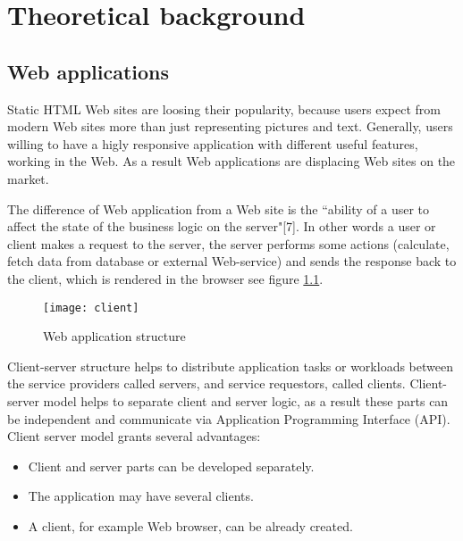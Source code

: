 \chapter{Theoretical background}
\label{ch:background} 
	\section{Web applications}
		
		
	  Static HTML Web sites are loosing their popularity, because users
	  expect from modern Web sites more than just representing pictures and text.
	  Generally, users willing to have a higly responsive application with different useful
	  features, working in the Web. As a result Web applications are displacing Web
	  sites on the market.
	  
	   The difference of Web application from a Web site is the
	 ``ability of a user to affect the state of the business logic on the
	 server"[7]. In other words a user or client makes a request to the server,
	 the server performs some actions (calculate, fetch data from database or
	 external Web-service) and sends the response back to the client, which is rendered in the browser see
	  figure \ref{fig:pic1}.
	  
	  \begin{figure}
      	\texttt{[image: client]}
      	\caption{Web application structure}
      	\label{fig:pic1}
      \end{figure}
	  
    	Client-server structure helps to distribute application tasks or workloads
    	between the service providers called servers, and service requestors,
    	called clients. Client-server model helps to separate client and server logic, as
    	a result these parts can be independent and communicate via Application
    	Programming Interface (API). Client server model grants several advantages:
    	\begin{itemize}
    	  \item Client and server parts can be developed separately.
    	  \item The application may have several clients.
    	  \item A client, for example Web browser, can be already created.
    	\end{itemize}
    		
